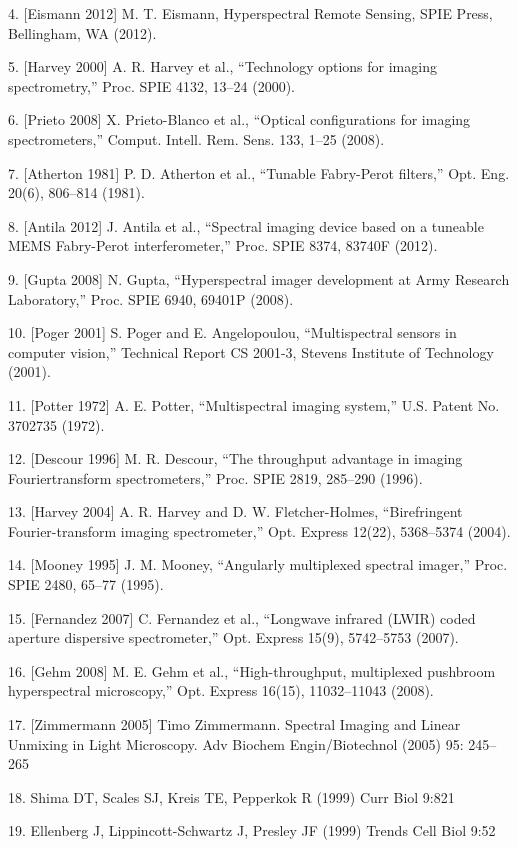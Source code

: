 \documentclass{ctuthesis}
\begin{document}
4. [Eismann 2012] M. T. Eismann, Hyperspectral Remote Sensing, SPIE Press, Bellingham, WA (2012).

5. [Harvey 2000] A. R. Harvey et al., “Technology options for imaging spectrometry,”
Proc. SPIE 4132, 13–24 (2000).

6. [Prieto 2008] X. Prieto-Blanco et al., “Optical configurations for imaging spectrometers,” Comput. Intell. Rem. Sens. 133, 1–25 (2008).

7. [Atherton 1981] P. D. Atherton et al., “Tunable Fabry-Perot filters,” Opt. Eng. 20(6),
806–814 (1981).

8. [Antila 2012] J. Antila et al., “Spectral imaging device based on a tuneable MEMS
Fabry-Perot interferometer,” Proc. SPIE 8374, 83740F (2012).

9. [Gupta 2008] N. Gupta, “Hyperspectral imager development at Army Research
Laboratory,” Proc. SPIE 6940, 69401P (2008).

10. [Poger 2001] S. Poger and E. Angelopoulou, “Multispectral sensors in computer
vision,” Technical Report CS 2001-3, Stevens Institute of Technology (2001).

11. [Potter 1972] A. E. Potter, “Multispectral imaging system,” U.S. Patent No. 3702735 (1972).

12. [Descour 1996] M. R. Descour, “The throughput advantage in imaging Fouriertransform spectrometers,” Proc. SPIE 2819, 285–290 (1996).

13. [Harvey 2004] A. R. Harvey and D. W. Fletcher-Holmes, “Birefringent Fourier-transform imaging spectrometer,” Opt. Express 12(22), 5368–5374 (2004).

14. [Mooney 1995] J. M. Mooney, “Angularly multiplexed spectral imager,” Proc. SPIE
2480, 65–77 (1995).

15. [Fernandez 2007] C. Fernandez et al., “Longwave infrared (LWIR) coded aperture
dispersive spectrometer,” Opt. Express 15(9), 5742–5753 (2007).

16. [Gehm 2008] M. E. Gehm et al., “High-throughput, multiplexed pushbroom hyperspectral microscopy,” Opt. Express 16(15), 11032–11043 (2008).

17. [Zimmermann 2005] Timo Zimmermann. Spectral Imaging and Linear Unmixing in Light Microscopy. Adv Biochem Engin/Biotechnol (2005) 95: 245– 265

18. Shima DT, Scales SJ, Kreis TE, Pepperkok R (1999) Curr Biol 9:821 

19. Ellenberg J, Lippincott-Schwartz J, Presley JF (1999) Trends Cell Biol 9:52
\end{document}

